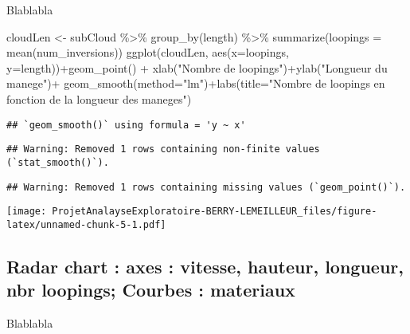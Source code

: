 \documentclass[
]{article}
\newenvironment{Shaded}{\begin{snugshade}}{\end{snugshade}}
\newcommand{\AttributeTok}[1]{\textcolor[rgb]{0.77,0.63,0.00}{#1}}
\newcommand{\FunctionTok}[1]{\textcolor[rgb]{0.00,0.00,0.00}{#1}}
\newcommand{\NormalTok}[1]{#1}
\newcommand{\OtherTok}[1]{\textcolor[rgb]{0.56,0.35,0.01}{#1}}
\newcommand{\SpecialCharTok}[1]{\textcolor[rgb]{0.00,0.00,0.00}{#1}}
\newcommand{\StringTok}[1]{\textcolor[rgb]{0.31,0.60,0.02}{#1}}
\begin{document}
Blablabla

\begin{Shaded}
\begin{Highlighting}[]
\NormalTok{cloudLen }\OtherTok{\textless{}{-}}\NormalTok{ subCloud }\SpecialCharTok{\%\textgreater{}\%} \FunctionTok{group\_by}\NormalTok{(length) }\SpecialCharTok{\%\textgreater{}\%} 
  \FunctionTok{summarize}\NormalTok{(}\AttributeTok{loopings =} \FunctionTok{mean}\NormalTok{(num\_inversions))}
\FunctionTok{ggplot}\NormalTok{(cloudLen, }\FunctionTok{aes}\NormalTok{(}\AttributeTok{x=}\NormalTok{loopings, }\AttributeTok{y=}\NormalTok{length))}\SpecialCharTok{+}\FunctionTok{geom\_point}\NormalTok{() }\SpecialCharTok{+} \FunctionTok{xlab}\NormalTok{(}\StringTok{"Nombre de loopings"}\NormalTok{)}\SpecialCharTok{+}\FunctionTok{ylab}\NormalTok{(}\StringTok{"Longueur du manege"}\NormalTok{)}\SpecialCharTok{+} \FunctionTok{geom\_smooth}\NormalTok{(}\AttributeTok{method=}\StringTok{"lm"}\NormalTok{)}\SpecialCharTok{+}\FunctionTok{labs}\NormalTok{(}\AttributeTok{title=}\StringTok{"Nombre de loopings en fonction de la longueur des maneges"}\NormalTok{)}
\end{Highlighting}
\end{Shaded}

\begin{verbatim}
## `geom_smooth()` using formula = 'y ~ x'
\end{verbatim}

\begin{verbatim}
## Warning: Removed 1 rows containing non-finite values (`stat_smooth()`).
\end{verbatim}

\begin{verbatim}
## Warning: Removed 1 rows containing missing values (`geom_point()`).
\end{verbatim}

\texttt{[image: ProjetAnalayseExploratoire-BERRY-LEMEILLEUR\_files/figure-latex/unnamed-chunk-5-1.pdf]}

\hypertarget{radar-chart-axes-vitesse-hauteur-longueur-nbr-loopings-courbes-materiaux}{%
\subsection{Radar chart : axes : vitesse, hauteur, longueur, nbr
loopings; Courbes :
materiaux}\label{radar-chart-axes-vitesse-hauteur-longueur-nbr-loopings-courbes-materiaux}}

Blablabla
\end{document}

